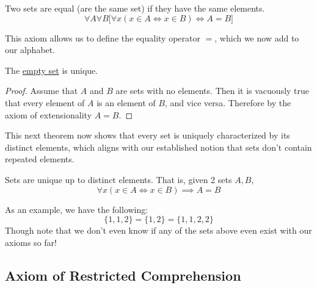   \begin{axiom}
    \label{thm:axiom-of-extensionality}
    Two sets are equal (are the same set) if they have the same elements. 
    \begin{equation}
      \forall A \forall B \big[ \forall x (x \in A \iff x \in B) \iff A = B\big]
    \end{equation}
  \end{axiom} 

  \begin{definition}[Equality]
    \label{def:equality}
    This axiom allows us to define the equality operator $=$, which we now add to our alphabet. 
  \end{definition} 

  \begin{theorem}
    \label{thm:uniqueness-of-empty-set}
    The \hyperref[def:empty-set]{empty set} is unique. 
  \end{theorem}
  \begin{proof}
    Assume that $A$ and $B$ are sets with no elements. Then it is vacuously true that every element of $A$ is an element of $B$, and vice versa. Therefore by the axiom of extensionality $A = B$. 
  \end{proof}

  This next theorem now shows that every set is uniquely characterized by its distinct elements, which aligns with our established notion that sets don't contain repeated elements. 

  \begin{theorem}
    \label{thm:sets-dont-contain-repeated-elements}
    Sets are unique up to distinct elements. That is, given 2 sets $A, B$, 
    \begin{equation}
      \forall x (x \in A \iff x \in B) \implies A = B
    \end{equation}
  \end{theorem} 

  As an example, we have the following: 
  \begin{equation}
    \{1, 1, 2\} = \{1, 2\} = \{1, 1, 2, 2\}
  \end{equation} 
  Though note that we don't even know if any of the sets above even exist with our axioms so far! 

\subsection{Axiom of Restricted Comprehension}

